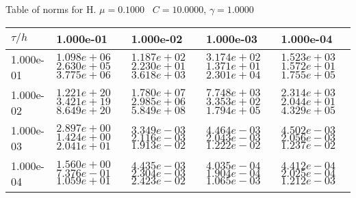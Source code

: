 \begin{center}
Table of norms for H. $\mu = 0.1000$ \, $C = 10.0000$, $\gamma = 1.0000$
  
\begin{tabular}{|p{1in}|p{1in}|p{1in}|p{1in}|p{1in}|} \hline
$\tau / h$ &1.000e-01 &1.000e-02 &1.000e-03 &1.000e-04 \\ \hline 
1.000e-01 & $1.098e+06$  $2.630e+05$  $3.775e+06$  & $1.187e+02$  $2.230e+01$  $3.618e+03$  & $3.174e+02$  $1.371e+01$  $2.301e+04$  & $1.523e+03$  $1.572e+01$  $1.755e+05$  \\ \hline 
1.000e-02 & $1.221e+20$  $3.421e+19$  $8.649e+20$  & $1.780e+07$  $2.985e+06$  $5.849e+08$  & $7.748e+03$  $3.353e+02$  $1.794e+05$  & $2.314e+03$  $2.044e+01$  $4.329e+05$  \\ \hline 
1.000e-03 & $2.897e+00$  $1.424e+00$  $2.041e+01$  & $3.349e-03$  $2.116e-03$  $1.913e-02$  & $4.464e-03$  $2.043e-03$  $1.222e-02$  & $4.502e-03$  $2.056e-03$  $1.237e-02$  \\ \hline 
1.000e-04 & $1.560e+00$  $7.376e-01$  $1.059e+01$  & $4.435e-03$  $2.304e-03$  $2.423e-02$  & $4.035e-04$  $1.904e-04$  $1.065e-03$  & $4.412e-04$  $2.025e-04$  $1.212e-03$  \\ \hline 

\end{tabular}\\[20pt]
\end{center}
